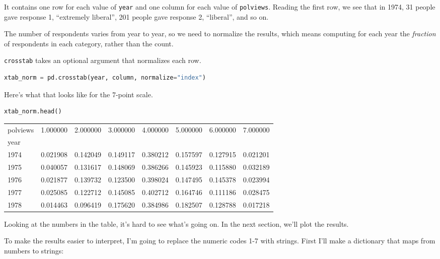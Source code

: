 It contains one row for each value of \passthrough{\lstinline!year!} and
one column for each value of \passthrough{\lstinline!polviews!}. Reading
the first row, we see that in 1974, 31 people gave response 1,
``extremely liberal'', 201 people gave response 2, ``liberal'', and so
on.

The number of respondents varies from year to year, so we need to
normalize the results, which means computing for each year the
\emph{fraction} of respondents in each category, rather than the count.

\passthrough{\lstinline!crosstab!} takes an optional argument that
normalizes each row.

\begin{lstlisting}[language=Python,style=source]
xtab_norm = pd.crosstab(year, column, normalize="index")
\end{lstlisting}

Here's what that looks like for the 7-point scale.

\begin{lstlisting}[language=Python,style=source]
xtab_norm.head()
\end{lstlisting}

\begin{tabular}{lrrrrrrr}
\midrule
polviews & 1.000000 & 2.000000 & 3.000000 & 4.000000 & 5.000000 & 6.000000 & 7.000000 \\
year &  &  &  &  &  &  &  \\
\midrule
1974 & 0.021908 & 0.142049 & 0.149117 & 0.380212 & 0.157597 & 0.127915 & 0.021201 \\
1975 & 0.040057 & 0.131617 & 0.148069 & 0.386266 & 0.145923 & 0.115880 & 0.032189 \\
1976 & 0.021877 & 0.139732 & 0.123500 & 0.398024 & 0.147495 & 0.145378 & 0.023994 \\
1977 & 0.025085 & 0.122712 & 0.145085 & 0.402712 & 0.164746 & 0.111186 & 0.028475 \\
1978 & 0.014463 & 0.096419 & 0.175620 & 0.384986 & 0.182507 & 0.128788 & 0.017218 \\
\midrule
\end{tabular}

Looking at the numbers in the table, it's hard to see what's going on.
In the next section, we'll plot the results.

To make the results easier to interpret, I'm going to replace the
numeric codes 1-7 with strings. First I'll make a dictionary that maps
from numbers to strings:


